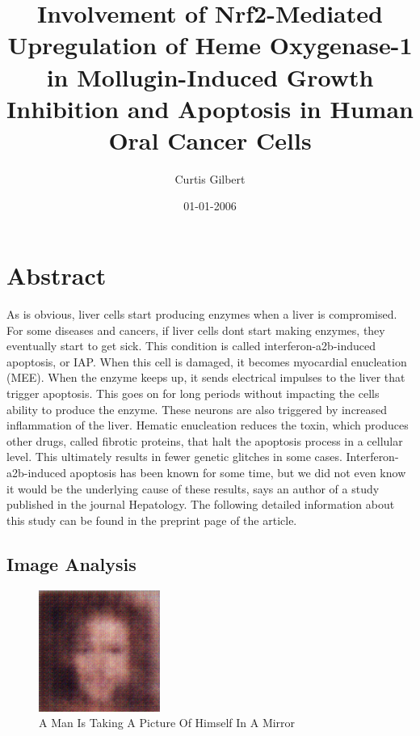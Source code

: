 \documentclass{article}%
\title{Involvement of Nrf2{-}Mediated Upregulation of Heme Oxygenase{-}1 in Mollugin{-}Induced Growth Inhibition and Apoptosis in Human Oral Cancer Cells}%
\author{Curtis Gilbert}%
\affil{School of Dentistry, Chung Shan Medical University, Taichung 40201, Taiwan}%
\date{01{-}01{-}2006}%
\begin{document}
%
\normalsize%
\maketitle%
\section{Abstract}%
\label{sec:Abstract}%
As is obvious, liver cells start producing enzymes when a liver is compromised. For some diseases and cancers, if liver cells dont start making enzymes, they eventually start to get sick.\newline%
This condition is called interferon{-}a2b{-}induced apoptosis, or IAP. When this cell is damaged, it becomes myocardial enucleation (MEE). When the enzyme keeps up, it sends electrical impulses to the liver that trigger apoptosis. This goes on for long periods without impacting the cells ability to produce the enzyme. These neurons are also triggered by increased inflammation of the liver.\newline%
Hematic enucleation reduces the toxin, which produces other drugs, called fibrotic proteins, that halt the apoptosis process in a cellular level. This ultimately results in fewer genetic glitches in some cases.\newline%
Interferon{-}a2b{-}induced apoptosis has been known for some time, but we did not even know it would be the underlying cause of these results, says an author of a study published in the journal Hepatology.\newline%
The following detailed information about this study can be found in the preprint page of the article.

%
\subsection{Image Analysis}%
\label{subsec:ImageAnalysis}%


\begin{figure}[h!]%
\centering%
\includegraphics[width=150px]{500_fake_images/samples_5_43.png}%
\caption{A Man Is Taking A Picture Of Himself In A Mirror}%
\end{figure}

%
\end{document}
